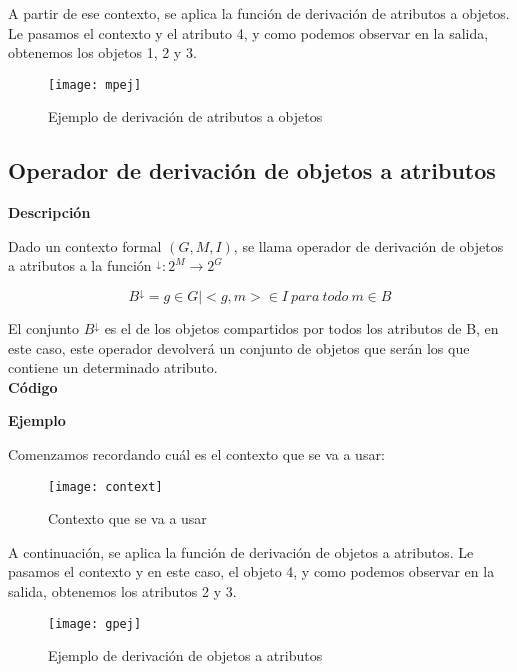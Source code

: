         A partir de ese contexto, se aplica la funci\'on de derivaci\'on de atributos a objetos. Le pasamos el contexto y el atributo 4, y 
        como podemos observar en la salida, obtenemos los objetos 1, 2 y 3.

        \begin{figure}[H]
            \centering
            \texttt{[image: mpej]}
            \caption{Ejemplo de derivaci\'on de atributos a objetos}
            \label{fig:mpej}
        \end{figure}


    \subsection{Operador de derivaci\'on de objetos a atributos}

        \textbf{Descripci\'on}

        Dado un contexto formal \( (G, M, I) \), se llama operador de derivaci\'on de objetos a atributos a la 
        funci\'on \( ^\downarrow : 2^M \rightarrow 2^G \)

        \[ B^\downarrow = { g \in G | <g,m> \in I ~ para ~ todo ~ m \in B } \]

        El conjunto \( B^\downarrow \) es el de los objetos compartidos por todos los atributos de B, en este caso, este operador devolver\'a 
        un conjunto de objetos que ser\'an los que contiene un determinado atributo.
        \\


        \textbf{C\'odigo}

        

        \clearpage

        \textbf{Ejemplo}

        Comenzamos recordando cu\'al es el contexto que se va a usar:

        \begin{figure}[H]
            \centering
            \texttt{[image: context]}
            \caption{Contexto que se va a usar}
            \label{fig:context}
        \end{figure}

        A continuaci\'on, se aplica la funci\'on de derivaci\'on de objetos a atributos. Le pasamos el contexto y en este caso, el objeto 4, y 
        como podemos observar en la salida, obtenemos los atributos 2 y 3.

        \begin{figure}[H]
            \centering
            \texttt{[image: gpej]}
            \caption{Ejemplo de derivaci\'on de objetos a atributos}
            \label{fig:gpej}
        \end{figure}


